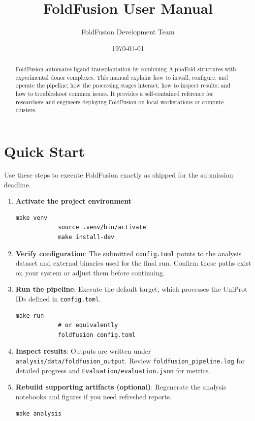 \documentclass[11pt]{article}
\title{FoldFusion User Manual}
\author{FoldFusion Development Team}
\date{\today}
\begin{document}
\maketitle

\begin{abstract}
      FoldFusion automates ligand transplantation by combining AlphaFold structures
      with experimental donor complexes. This manual explains how to install,
      configure, and operate the pipeline; how the processing stages interact; how to
      inspect results; and how to troubleshoot common issues. It provides a
      self-contained reference for researchers and engineers deploying FoldFusion on
      local workstations or compute clusters.
\end{abstract}

\tableofcontents
\newpage

\section{Quick Start}
Use these steps to execute FoldFusion exactly as shipped for the submission
deadline.

\begin{enumerate}[noitemsep]
      \item \textbf{Activate the project environment}
            \begin{lstlisting}[style=commandline]
            make venv
            source .venv/bin/activate
            make install-dev
            \end{lstlisting}
      \item \textbf{Verify configuration}: The submitted \texttt{config.toml}
            points to the analysis dataset and external binaries used for the
            final run. Confirm those paths exist on your system or adjust them
            before continuing.
      \item \textbf{Run the pipeline}: Execute the default target, which
            processes the UniProt IDs defined in \texttt{config.toml}.
            \begin{lstlisting}[style=commandline]
            make run
            # or equivalently
            foldfusion config.toml
            \end{lstlisting}
      \item \textbf{Inspect results}: Outputs are written under
            \texttt{analysis/data/foldfusion\_output}. Review
            \texttt{foldfusion\_pipeline.log} for detailed progress and
            \texttt{Evaluation/evaluation.json} for metrics.
      \item \textbf{Rebuild supporting artifacts (optional)}: Regenerate the
            analysis notebooks and figures if you need refreshed reports.
            \begin{lstlisting}[style=commandline]
            make analysis
            \end{lstlisting}
\end{enumerate}
\end{document}
